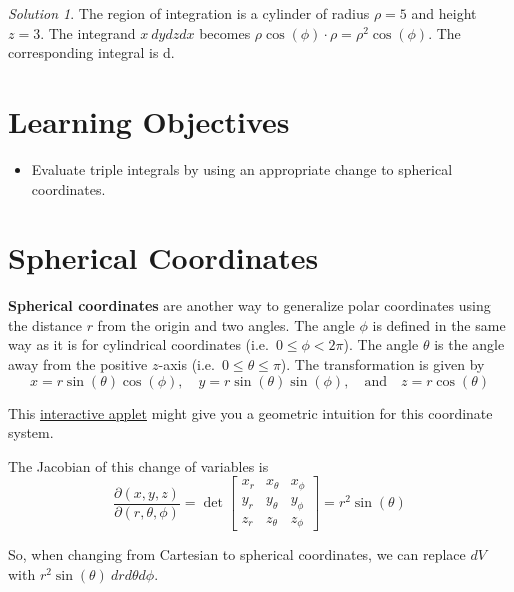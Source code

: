 \documentclass[
]{book}
\providecommand{\tightlist}{%
  \setlength{\itemsep}{0pt}\setlength{\parskip}{0pt}}
\theoremstyle{definition}
\theoremstyle{definition}
\theoremstyle{definition}
\theoremstyle{definition}
\theoremstyle{remark}
\newtheorem*{solution}{Solution}
\begin{document}
\begin{solution}

The region of integration is a cylinder of radius \(\rho=5\) and height \(z=3\). The integrand \(x~dydzdx\) becomes \(\rho\cos(\phi)\cdot \rho = \rho^2\cos(\phi)\). The corresponding integral is d.

\end{solution}

\hypertarget{learning-objectives-16}{%
\section{Learning Objectives}\label{learning-objectives-16}}

\begin{itemize}
\tightlist
\item
  Evaluate triple integrals by using an appropriate change to spherical coordinates.
\end{itemize}

\hypertarget{spherical-coordinates}{%
\section{Spherical Coordinates}\label{spherical-coordinates}}

\textbf{Spherical coordinates} are another way to generalize polar coordinates using the distance \(r\) from the origin and two angles. The angle \(\phi\) is defined in the same way as it is for cylindrical coordinates (i.e.~\(0\leq \phi < 2\pi\)). The angle \(\theta\) is the angle away from the positive \(z\)-axis (i.e.~\(0\leq \theta \leq \pi\)). The transformation is given by \[x=r\sin(\theta)\cos(\phi), \quad y=r\sin(\theta)\sin(\phi), \quad \mbox{and}\quad z= r\cos(\theta)\]

This \href{https://www.geogebra.org/m/kzfa7ybh}{interactive applet} might give you a geometric intuition for this coordinate system.

The Jacobian of this change of variables is \[\frac{\partial (x,y,z)}{\partial (r,\theta, \phi)}=\det \begin{bmatrix}x_{r}& x_{\theta}& x_{\phi} \\
y_{r}& y_{\theta}& y_{\phi} \\ z_{r}& z_{\theta}& z_{\phi} \end{bmatrix}=r^2\sin(\theta)\]

So, when changing from Cartesian to spherical coordinates, we can replace \(dV\) with \(r^2\sin(\theta)~drd\theta d\phi\).
\end{document}
